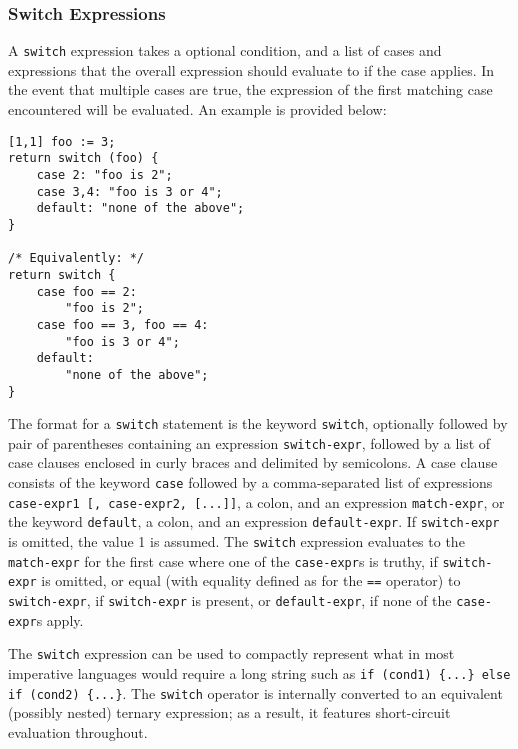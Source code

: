 \subsubsection{Switch Expressions}
\label{sec:Switch}
A \texttt{switch} expression takes a optional condition, and a list of cases and expressions that the overall expression should evaluate to if the case applies. In the event that multiple cases are true, the expression of the first matching case encountered will be evaluated. An example is provided below:
\begin{lstlisting}
[1,1] foo := 3;
return switch (foo) {
	case 2: "foo is 2";
	case 3,4: "foo is 3 or 4";
	default: "none of the above";
}

/* Equivalently: */
return switch {
	case foo == 2:
		"foo is 2";
	case foo == 3, foo == 4:
		"foo is 3 or 4";
	default:
		"none of the above";
}
\end{lstlisting}
The format for a \texttt{switch} statement is the keyword \texttt{switch}, optionally followed by pair of parentheses containing an expression \texttt{switch-expr}, followed by a list of case clauses enclosed in curly braces and delimited by semicolons. A case clause consists of the keyword \texttt{case} followed by a comma-separated list of expressions \texttt{case-expr1 [, case-expr2, [...]]}, a colon, and an expression \texttt{match-expr}, or the keyword \texttt{default}, a colon, and an expression \texttt{default-expr}. If \texttt{switch-expr} is omitted, the value 1 is assumed. The \texttt{switch} expression evaluates to the \texttt{match-expr} for the first case where one of the \texttt{case-expr}s is truthy, if \texttt{switch-expr} is omitted, or equal (with equality defined as for the \texttt{==} operator) to \texttt{switch-expr}, if \texttt{switch-expr} is present, or \texttt{default-expr}, if none of the \texttt{case-expr}s apply.

The \texttt{switch} expression can be used to compactly represent what in most imperative languages would require a long string such as \texttt{if (cond1) \{...\} else if (cond2) \{...\}}. The \texttt{switch} operator is internally converted to an equivalent (possibly nested) ternary expression; as a result, it features short-circuit evaluation throughout.

